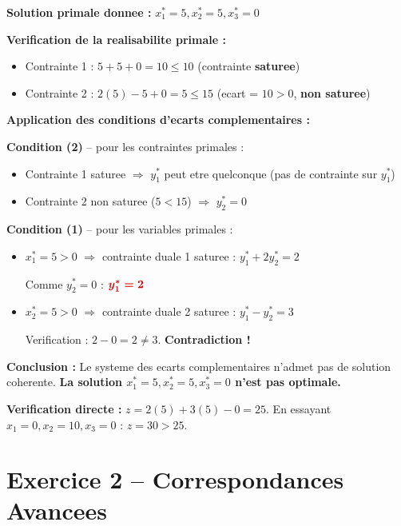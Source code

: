 \documentclass[12pt,a4paper]{article}
\begin{document}
\begin{correction}
\textbf{Solution primale donnee :} $x_1^* = 5, x_2^* = 5, x_3^* = 0$

\textbf{Verification de la realisabilite primale :}
\begin{itemize}
    \item Contrainte 1 : $5 + 5 + 0 = 10 \leq 10$ \checkmark (contrainte \textcolor{importantrouge}{\textbf{saturee}})
    \item Contrainte 2 : $2(5) - 5 + 0 = 5 \leq 15$ \checkmark (ecart = $10 > 0$, \textcolor{defvert}{\textbf{non saturee}})
\end{itemize}

\textbf{Application des conditions d'ecarts complementaires :}

\textbf{Condition (2)} -- pour les contraintes primales :
\begin{itemize}
    \item Contrainte 1 saturee $\Rightarrow$ $y_1^*$ peut etre quelconque (pas de contrainte sur $y_1^*$)
    \item Contrainte 2 non saturee ($5 < 15$) $\Rightarrow$ \textcolor{importantrouge}{\textbf{$y_2^* = 0$}}
\end{itemize}

\textbf{Condition (1)} -- pour les variables primales :
\begin{itemize}
    \item $x_1^* = 5 > 0$ $\Rightarrow$ contrainte duale 1 saturee : $y_1^* + 2y_2^* = 2$
    
    Comme $y_2^* = 0$ : $\textcolor{importantrouge}{\boldsymbol{y_1^* = 2}}$
    
    \item $x_2^* = 5 > 0$ $\Rightarrow$ contrainte duale 2 saturee : $y_1^* - y_2^* = 3$
    
    Verification : $2 - 0 = 2 \neq 3$. \textcolor{importantrouge}{\textbf{Contradiction !}}
\end{itemize}

\textbf{Conclusion :} Le systeme des ecarts complementaires n'admet pas de solution coherente. \textcolor{importantrouge}{\textbf{La solution $x_1^* = 5, x_2^* = 5, x_3^* = 0$ n'est pas optimale.}}

\textbf{Verification directe :} $z = 2(5) + 3(5) - 0 = 25$. En essayant $x_1 = 0, x_2 = 10, x_3 = 0$ : $z = 30 > 25$. 
\end{correction}

\newpage
\section{Exercice 2 -- Correspondances Avancees}
\end{document}
